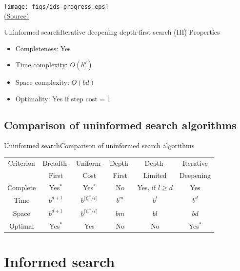 \documentclass[10pt,compress]{beamer} %
\begin{document}
\begin{frame}
      \begin{center}
          \texttt{[image: figs/ids-progress.eps]}\\
          \tiny{\href{http://aima.cs.berkeley.edu/index.html}{(Source)}}
      \end{center}
\end{frame}

\begin{frame}{Uninformed search}{Iterative deepening depth-first search (III)}
      Properties
      \begin{itemize}
        \item Completeness: Yes
        \item Time complexity: $O(b^{d})$
        \item Space complexity: $O(bd)$
        \item Optimality: Yes if step cost = 1
      \end{itemize}
\end{frame}


\subsection{Comparison of uninformed search algorithms}

\begin{frame}{Uninformed search}{Comparison of uninformed search algorithms}

\begin{tabular}{cccccc}
\hline
Criterion & Breadth- & Uniform- & Depth- & Depth- & Iterative \\
          & First &  Cost & First & Limited & Deepening \\
\hline
Complete  & Yes$^*$ & Yes$^*$ & No & Yes, if $l \ge d$ & Yes \\
Time      & $b^{d+1}$ & $b^{\lceil C^*/\epsilon \rceil}$ & $b^m$ & $b^l$ & $b^d$ \\
Space     & $b^{d+1}$ & $b^{\lceil C^*/\epsilon \rceil}$ & $bm$ & $bl$ & $bd$ \\
Optimal   & Yes$^*$ & Yes & No & No & Yes$^*$ \\
\hline
\end{tabular}

\end{frame}


\section{Informed search}
\end{document}
